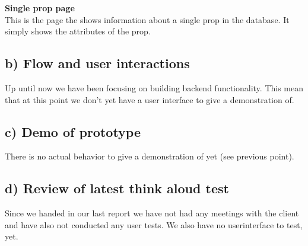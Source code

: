 \documentclass[12pt]{article}
\begin{document}
\newline
\textbf{Single prop page}\\
This is the page the shows information about a single prop in the database. It simply shows the attributes of the prop.
\subsection{b) Flow and user interactions}
Up until now we have been focusing on building backend functionality. This mean that at this point we don't yet have a user interface to give a demonstration of.
\subsection{c) Demo of prototype}
There is no actual behavior to give a demonstration of yet (see previous point).
\subsection{d) Review of latest think aloud test}
Since we handed in our last report we have not had any meetings with the client and have also not conducted any user tests. We also have no userinterface to test, yet.
\end{document}
